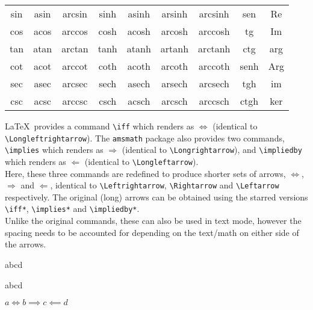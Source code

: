 \begin{center}
    \begin{tabular}{*{9}{c}} %
        sin & asin & arcsin & sinh & asinh & arsinh & arcsinh & sen  & Re \\
        cos & acos & arccos & cosh & acosh & arcosh & arccosh & tg   & Im \\
        tan & atan & arctan & tanh & atanh & artanh & arctanh & ctg  & arg \\
        cot & acot & arccot & coth & acoth & arcoth & arccoth & senh & Arg \\
        sec & asec & arcsec & sech & asech & arsech & arcsech & tgh  & im \\
        csc & acsc & arccsc & csch & acsch & arcsch & arccsch & ctgh & ker
    \end{tabular}
\end{center}

\LaTeX\ provides a command \verb!\iff! which renders as $\Longleftrightarrow$ (identical to \verb!\Longleftrightarrow!). The \texttt{amsmath} package also provides two commands, \verb!\implies! which renders as $\Longrightarrow$ (identical to \verb!\Longrightarrow!), and \verb!\impliedby! which renders as $\Longleftarrow$ (identical to \verb!\Longleftarrow!).\\

Here, these three commands are redefined to produce shorter sets of arrows, $\Leftrightarrow$, $\Rightarrow$ and $\Leftarrow$, identical to \verb!\Leftrightarrow!, \verb!\Rightarrow! and \verb!\Leftarrow! respectively. The original (long) arrows can be obtained using the starred versions \verb!\iff*!, \verb!\implies*! and \verb!\impliedby*!.\\

Unlike the original commands, these can also be used in text mode, however the spacing needs to be accounted for depending on the text/math on either side of the arrows.

\begin{verbbox}
a\iff b\implies c\impliedby d
\end{verbbox}

\begin{verbbox}
a\iff* b\implies* c\impliedby* d
\end{verbbox}

\begin{verbbox}
$a\iff b\implies c\impliedby d$
\end{verbbox}

